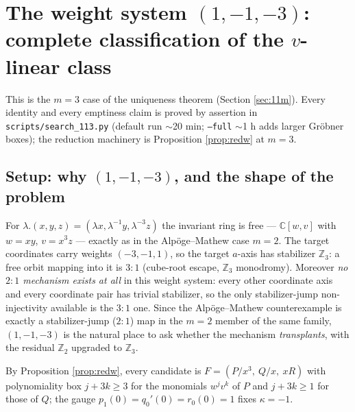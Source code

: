 \documentclass[11pt]{article}
\theoremstyle{definition}
\theoremstyle{remark}
\newcommand{\C}{\mathbb{C}}
\newcommand{\Z}{\mathbb{Z}}
\begin{document}
\section{The weight system \texorpdfstring{$(1,-1,-3)$}{(1,-1,-3)}:
complete classification of the \texorpdfstring{$v$}{v}-linear
class}\label{sec:113}

This is the $m=3$ case of the uniqueness theorem
(Section \ref{sec:11m}). Every identity and every emptiness claim
is proved by assertion in \texttt{scripts/search\_113.py} (default run
$\sim$20 min; \texttt{--full} $\sim$1 h adds larger Gr\"obner boxes);
the reduction machinery is Proposition \ref{prop:redw} at $m=3$.

\subsection{Setup: why \texorpdfstring{$(1,-1,-3)$}{(1,-1,-3)}, and the
shape of the problem}

For $\lambda.(x,y,z) = (\lambda x, \lambda^{-1}y, \lambda^{-3}z)$ the
invariant ring is free --- $\C[w,v]$ with $w = xy$, $v = x^3z$ ---
exactly as in the Alp\"oge--Mathew case $m=2$. The target coordinates
carry weights $(-3,-1,1)$, so the target $a$-axis has stabilizer
$\Z_3$: a free orbit mapping into it is $3{:}1$ (cube-root escape,
$\Z_3$ monodromy). Moreover \emph{no $2{:}1$ mechanism exists at all}
in this weight system: every other coordinate axis and every coordinate
pair has trivial stabilizer, so the only stabilizer-jump
non-injectivity available is the $3{:}1$ one. Since the
Alp\"oge--Mathew counterexample is exactly a stabilizer-jump ($2{:}1$)
map in the $m=2$ member of the same family, $(1,-1,-3)$ is the natural
place to ask whether the mechanism \emph{transplants}, with the residual
$\Z_2$ upgraded to $\Z_3$.

By Proposition \ref{prop:redw}, every candidate is
$F = (P/x^3,\ Q/x,\ xR)$ with polynomiality box $j + 3k \ge 3$ for the
monomials $w^jv^k$ of $P$ and $j + 3k \ge 1$ for those of $Q$; the gauge
$p_1(0) = q_0'(0) = r_0(0) = 1$ fixes $\kappa = -1$.
\end{document}
